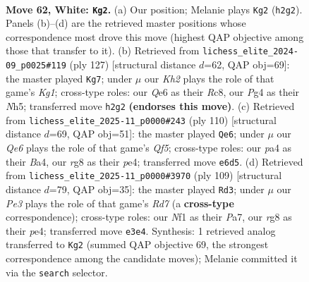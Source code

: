 \documentclass[11pt]{article}
\begin{document}
\clearpage

\begin{figure}[p]\centering
\begin{subfigure}{0.46\textwidth}\centering
\resizebox{\linewidth}{!}{%
\newchessgame
\chessboard[
  setfen={1r4r1/p5p1/4Q2p/k2p3P/p2P2P1/1q2P3/7K/4bN2 w - - 32 62},
  showmover=false,
  pgfstyle=straightmove, color=movearrow, markmove={h2-g2}
]}
\caption{}
\end{subfigure}\hfill
\begin{subfigure}{0.46\textwidth}\centering
\resizebox{\linewidth}{!}{%
\newchessgame
\chessboard[
  setfen={2r3k1/5p2/2P1p1p1/4q1Pn/4P3/2R1QK2/2R5/8 b - - 4 64},
  showmover=false,
  pgfstyle=straightmove, color=movearrow, markmove={g8-g7}
]}
\caption{}
\end{subfigure}
\\[4pt]
\begin{subfigure}{0.46\textwidth}\centering
\resizebox{\linewidth}{!}{%
\newchessgame
\chessboard[
  setfen={3r1k2/4q3/1R1p1p1p/p1pP1Q2/B1P1p1P1/6K1/8/8 w - - 0 56},
  showmover=false,
  pgfstyle=straightmove, color=movearrow, markmove={f5-e6}
]}
\caption{}
\end{subfigure}\hfill
\begin{subfigure}{0.46\textwidth}\centering
\resizebox{\linewidth}{!}{%
\newchessgame
\chessboard[
  setfen={8/p4Q2/2P3pk/4p2p/3qP1nP/P5P1/3r1P2/4RRK1 b - - 0 55},
  showmover=false,
  pgfstyle=straightmove, color=movearrow, markmove={d2-d3}
]}
\caption{}
\end{subfigure}
\caption{\textbf{Move 62, White: \texttt{Kg2}.} (a) Our position; Melanie plays \texttt{Kg2} (\texttt{h2g2}). Panels (b)--(d) are the retrieved master positions whose correspondence most drove this move (highest QAP objective among those that transfer to it). (b) Retrieved from \texttt{lichess\_elite\_2024-09\_p0025\#119} (ply 127) [structural distance $d$=62, QAP obj=69]: the master played \texttt{Kg7}; under $\mu$ our \emph{Kh2} plays the role of that game's \emph{Kg1}; cross-type roles: our \emph{Q}e6 as their \emph{R}c8, our \emph{P}g4 as their \emph{N}h5; transferred move \texttt{h2g2} \textbf{(endorses this move)}. (c) Retrieved from \texttt{lichess\_elite\_2025-11\_p0000\#243} (ply 110) [structural distance $d$=69, QAP obj=51]: the master played \texttt{Qe6}; under $\mu$ our \emph{Qe6} plays the role of that game's \emph{Qf5}; cross-type roles: our \emph{p}a4 as their \emph{B}a4, our \emph{r}g8 as their \emph{p}e4; transferred move \texttt{e6d5}. (d) Retrieved from \texttt{lichess\_elite\_2025-11\_p0000\#3970} (ply 109) [structural distance $d$=79, QAP obj=35]: the master played \texttt{Rd3}; under $\mu$ our \emph{Pe3} plays the role of that game's \emph{Rd7} (a \textbf{cross-type} correspondence); cross-type roles: our \emph{N}f1 as their \emph{P}a7, our \emph{r}g8 as their \emph{p}e4; transferred move \texttt{e3e4}. Synthesis: 1 retrieved analog transferred to \texttt{Kg2} (summed QAP objective 69, the strongest correspondence among the candidate moves); Melanie committed it via the \texttt{search} selector.}
\label{fig:thought-m122}
\end{figure}
\end{document}
